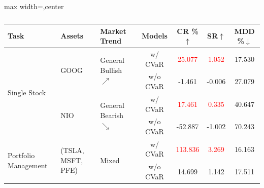 \begin{table}[ht]
\centering
\begin{adjustbox}{max width=\dimexpr\textwidth,center}
\begin{tabular}{p{2cm}p{1.8cm}lcccc}
\toprule
\textbf{Task} & \textbf{Assets} & \textbf{Market Trend} & \textbf{Models} & \textbf{CR \%}$\uparrow$ & \textbf{SR}$\uparrow$ & \textbf{MDD \%}$\downarrow$ \\
\midrule
\multirow{4}{=}{Single Stock} 
    & \multirow{2}{=}{GOOG} & \multirow{2}{*}{General Bullish $\nearrow$} & w/ CVaR & \textcolor{red}{25.077} & \textcolor{red}{1.052} & 17.530\\
    & & & w/o CVaR & -1.461 & -0.006 & 27.079\\
    & \multirow{2}{=}{NIO} & \multirow{2}{*}{General Bearish $\searrow$} & w/ CVaR & \textcolor{red}{17.461} & \textcolor{red}{0.335} & 40.647\\
    & & & w/o CVaR & -52.887 & -1.002 & 70.243\\
\midrule
\multirow{2}{=}{Portfolio Management} 
    & \multirow{2}{=}{(TSLA, MSFT, PFE)} & \multirow{2}{*}{Mixed} & w/ CVaR & \textcolor{red}{113.836} & \textcolor{red}{3.269}& 16.163 \\
    & & & w/o CVaR & 14.699 & 1.142 & 17.511  \\
\bottomrule
\end{tabular}
\end{adjustbox}
\caption{}
\label{tab:performance_overview_cvar}
\end{table}

